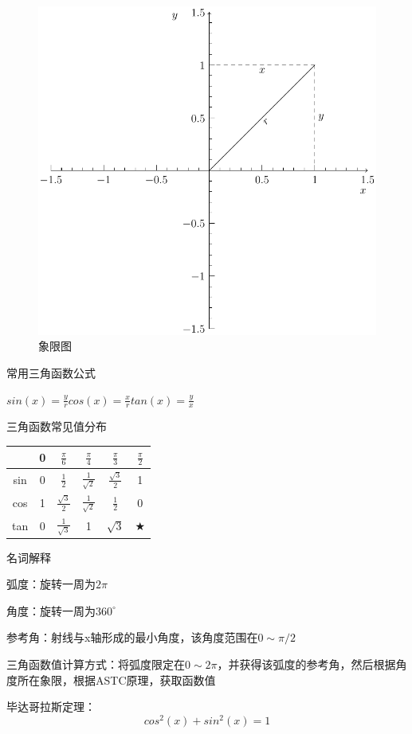 \documentclass[UTF8,fontset=ubuntu]{ctexart}
\begin{document}
\begin{figure}[H]
	\centering
	\includegraphics[scale=0.4]{quadrantal.pdf}
	\caption{象限图}
\end{figure}
常用三角函数公式\par
$sin(x)=\frac{y}{r}$\qquad$cos(x)=\frac{x}{r}$\qquad$tan(x)=\frac{y}{x}$\par
三角函数常见值分布\par
\begin{table}[H]
\centering
\begin{tabular}{c|c c c c c}
	\hline
	& 0 & $\frac{\pi}{6}$ & $\frac{\pi}{4}$ & $\frac{\pi}{3}$ & $\frac{\pi}{2}$\\
	\hline
	sin & 0 & $\frac{1}{2}$ & $\frac{1}{\sqrt{2}}$ & $\frac{\sqrt{3}}{2}$ & 1\\
	cos & 1 & $\frac{\sqrt{3}}{2}$ & $\frac{1}{\sqrt{2}}$ & $\frac{1}{2}$ & 0\\
	tan & 0 & $\frac{1}{\sqrt{3}}$ & 1 & $\sqrt{3}$ & $\bigstar$\\
	\hline
\end{tabular}
\end{table}
名词解释\par
弧度：旋转一周为$2\pi$\par
角度：旋转一周为$360^\circ$\par
参考角：射线与x轴形成的最小角度，该角度范围在$0\sim\pi/2$\par
三角函数值计算方式：将弧度限定在$0\sim2\pi$，并获得该弧度的参考角，然后根据角度所在象限，根据ASTC原理，获取函数值\par
毕达哥拉斯定理：
\[cos^2(x)+sin^2(x)=1\]
\end{document}
